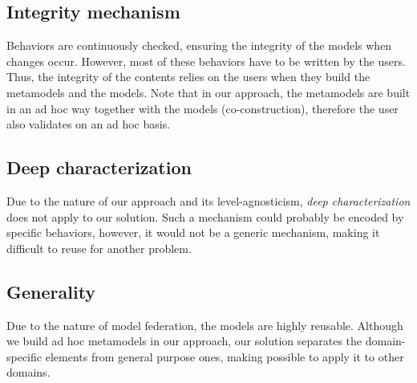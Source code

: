   \subsection{Integrity mechanism}


  Behaviors are continuously checked, ensuring the integrity of the models when
  changes occur. However, most of these behaviors have to be written by the
  users. Thus, the integrity of the contents relies on the users when they
  build the metamodels and the models.  Note that in our approach, the
  metamodels are built in an ad hoc way together with the models
  (co-construction), therefore the user also validates on an ad hoc basis.

  \subsection{Deep characterization}


  Due to the nature of our approach and its level-agnosticism, \emph{deep characterization} does not 
  apply to our solution. Such a mechanism could probably be encoded by specific behaviors, however, 
  it would not be a generic mechanism, making it difficult to reuse for another problem.

  \subsection{Generality}


  Due to the nature of model federation, the models are highly reusable.
  Although we build ad hoc metamodels in our approach, our solution separates
  the domain-specific elements from general purpose ones, making possible to 
  apply it to other domains. 

